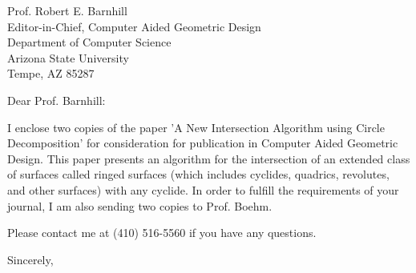 \signature{Prof. John K. Johnstone\\jj@cs.jhu.edu}

\begin{letter}
{Prof. Robert E. Barnhill\\
Editor-in-Chief, Computer Aided Geometric Design\\
Department of Computer Science\\
Arizona State University\\
Tempe, AZ  85287
}

\opening{Dear Prof. Barnhill:}

I enclose two copies of the paper 'A New Intersection Algorithm
using Circle Decomposition' for consideration for publication 
in Computer Aided Geometric Design.  This paper presents an algorithm
for the intersection of an extended class of surfaces called ringed surfaces
(which includes cyclides, quadrics, revolutes, and other surfaces)
with any cyclide.
In order to fulfill the requirements of your journal, I am also
sending two copies to Prof. Boehm.

Please contact me at (410) 516-5560 if you have any questions.

\closing{Sincerely,}
\end{letter}


